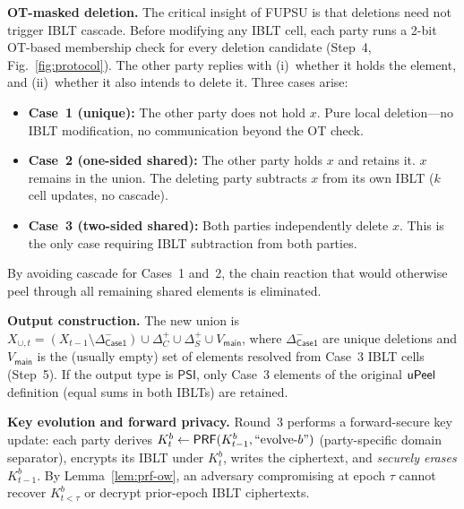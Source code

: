 	\smallskip\noindent\textbf{OT-masked deletion.}
	The critical insight of FUPSU is that deletions need not trigger IBLT
	cascade. Before modifying any IBLT cell, each party runs a 2-bit OT-based
	membership check for every deletion candidate (Step~4, Fig.~\ref{fig:protocol}).
	The other party replies with (i)~whether it holds the element, and
	(ii)~whether it also intends to delete it. Three cases arise:
	\begin{itemize}
	  \item \textbf{Case~1 (unique):} The other party does not hold $x$. Pure
	    local deletion---no IBLT modification, no communication beyond the OT check.
	  \item \textbf{Case~2 (one-sided shared):} The other party holds $x$ and
	    retains it. $x$ remains in the union. The deleting party subtracts $x$
	    from its own IBLT ($k$ cell updates, no cascade).
	  \item \textbf{Case~3 (two-sided shared):} Both parties independently
	    delete $x$. This is the only case requiring IBLT subtraction from both
	    parties.
	\end{itemize}
	By avoiding cascade for Cases~1 and~2, the chain reaction that would
	otherwise peel through all remaining shared elements is eliminated.

	\smallskip\noindent\textbf{Output construction.}
	The new union is $X_{\cup, t} = (X_{t-1} \setminus \Delta^-_{\mathsf{Case1}})
	\cup \Delta^+_C \cup \Delta^+_S \cup V_{\mathsf{main}}$, where
	$\Delta^-_{\mathsf{Case1}}$ are unique deletions and $V_{\mathsf{main}}$
	is the (usually empty) set of elements resolved from Case~3 IBLT cells
	(Step~5).  If the output type is $\mathsf{PSI}$, only Case~3 elements of
	the original $\mathsf{uPeel}$ definition (equal sums in both IBLTs) are retained.

	\smallskip\noindent\textbf{Key evolution and forward privacy.}
	Round~3 performs a forward-secure key update: each party derives
	$K^b_t \leftarrow \mathsf{PRF}(K^b_{t-1}, \text{``evolve-}b\text{''})$ (party-specific
	domain separator), encrypts its IBLT under $K^b_t$, writes the
	ciphertext, and \emph{securely erases} $K^b_{t-1}$.  By
	Lemma~\ref{lem:prf-ow}, an adversary compromising at epoch $\tau$ cannot
	recover $K^b_{t<\tau}$ or decrypt prior-epoch IBLT ciphertexts.

